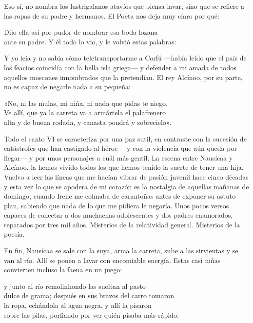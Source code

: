 Eso sí, no nombra los lustrigalanos atavíos que piensa lavar, sino que se refiere a las ropas de su padre y hermanos. El Poeta nos deja muy claro por qué:

\begin{versocita}
Dijo ella así por pudor de nombrar esa boda lozana\\
ante su padre. Y él todo lo vio, y le volvió estas palabras:
\end{versocita}

Y yo leía y no sabía cómo teletransportarme a Corfú ---había leído que el país de los feacios coincidía con la bella isla griega--- y defender a mi amada de todos aquellos moscones innombrados que la pretendían. El rey Alcínoo, por su parte, no es capaz de negarle nada a su pequeña:

\begin{versocita}
«No, ni las mulas, mi niña, ni nada que pidas te niego.\\
Ve allí, que ya la carreta va a armártela el palafrenero\\
alta y de buena rodada, y canasta pondrá y sobrecielo».
\end{versocita}

Todo el canto VI se caracteriza por una paz sutil, en contraste con la sucesión de catástrofes que han castigado al héroe ---y con la violencia que aún queda por llegar--- y por unos personajes a cuál más gentil. La escena entre Nausícaa y Alcínoo, la hemos vivido todos los que hemos tenido la suerte de tener una hija. Vuelvo a leer las líneas que me hacían vibrar de pasión juvenil hace cinco décadas y esta vez lo que se apodera de mi corazón es la nostalgia de aquellas mañanas de domingo, cuando Irene me colmaba de carantoñas antes de exponer su astuto plan, sabiendo que nada de lo que me pidiera le negaría. Unos pocos versos capaces de conectar a dos muchachas adolescentes y dos padres enamorados, separados por tres mil años. Misterios de la relatividad general. Misterios de la poesía.

En fin, Nausícaa se sale con la suya, arma la carreta, sube a las sirvientas y se van al río. Allí se ponen a lavar con encomiable energía. Estas casi niñas convierten incluso la faena en un juego:

\begin{versocita}
y junto al río remolinhondo las sueltan al pasto\\
dulce de grama; después en sus brazos del carro tomaron\\
la ropa, echándola al agua negra, y allí la pisaron\\
sobre las pilas, porfiando por ver quién pisaba más rápido.
\end{versocita}

